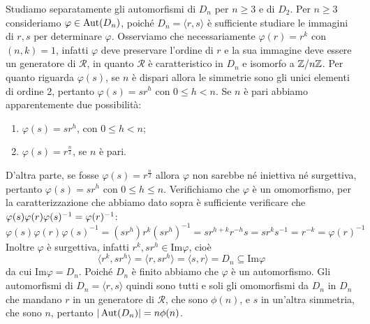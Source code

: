 \documentclass[11pt]{scrartcl}
\begin{document}
Studiamo separatamente gli automorfismi di $D_n$ per $n \geqslant 3$ e di $D_2$.\newline
Per $n\geqslant 3$ consideriamo $\varphi \in \operatorname{Aut}(D_n)$, poiché $D_n = \langle
r, s\rangle$ è sufficiente studiare le immagini di $r, s$ per determinare $\varphi$.
Osserviamo che necessariamente $\varphi(r) = r^k$ con $(n, k) = 1$, infatti 
$\varphi$ deve preservare l'ordine di $r$ e la sua immagine deve essere un 
generatore di $\mathcal{R}$, in quanto $\mathcal{R}$ è caratteristico in $D_n$
e isomorfo a ${\mathbb Z}/n{\mathbb Z}$. Per quanto riguarda $\varphi(s)$, se $n$ è dispari allora le simmetrie
sono gli unici elementi di ordine 2, pertanto $\varphi(s) = sr^h$ con 
$0\leq h < n$. Se $n$ è pari abbiamo apparentemente due possibilità:
\begin{enumerate}[(1)]
    \item $\varphi(s) = sr^h$, con $0\leq h < n$;
    \item $\varphi(s) = r^{\frac n 2}$, se $n$ è pari.
\end{enumerate}

D'altra parte, se fosse $\varphi(s) = r^{\frac n 2}$ allora $\varphi$ non
sarebbe né iniettiva né surgettiva, pertanto $\varphi(s) = sr^h$ con 
$0\leq h \leq n$. Verifichiamo che $\varphi$ è un omomorfismo, per la 
caratterizzazione che abbiamo dato sopra è sufficiente verificare che
$\varphi(s)\varphi(r)\varphi(s)^{-1} = \nolinebreak\varphi(r)^{-1}$:
\[
    \varphi(s)\varphi(r)\varphi(s)^{-1} = (sr^h)r^k(sr^h)^{-1} = sr^{h + k}r^{-h}s =
    sr^k s^{-1} = r^{-k} = \varphi(r)^{-1}
\]
Inoltre $\varphi$ è surgettiva, infatti $r^k, sr^h \in \mathrm{Im}\varphi$,
cioè 
\[
    \langle r^k, sr^h\rangle = \langle r, sr^h\rangle = \langle s, r\rangle =
    D_n\subseteq \mathrm{Im}\varphi
\]da cui $\mathrm{Im}\varphi = D_n$. Poiché $D_n$ è finito abbiamo che $\varphi$
è un automorfismo. Gli automorfismi di $D_n = \langle r, s\rangle$ quindi sono
tutti e soli gli omomorfismi da $D_n$ in $D_n$ che mandano $r$ in un generatore
di $\mathcal{R}$, che sono $\phi(n)$, e $s$ in un'altra simmetria, che sono 
$n$, pertanto $|\operatorname{Aut}(D_n)| = n\phi(n)$.\newline
\end{document}
